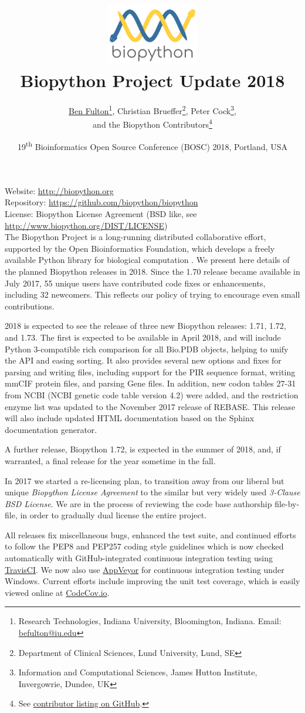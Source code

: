 \documentclass[10pt,oneside]{article}
\title{%
\vspace{-1.5in}
\includegraphics[width=0.3\textwidth]{biopython_logo_s.png} \\
\vspace{3mm}Biopython Project Update 2018}
\author{
	\underline{Ben Fulton}\thanks{Research Technologies, Indiana University, Bloomington, Indiana. Email: \href{mailto:befulton@iu.edu}{befulton@iu.edu}},
    Christian Brueffer\thanks{Department of Clinical Sciences, Lund University, Lund, SE},
    Peter Cock\thanks{Information and Computational Sciences, James Hutton Institute, Invergowrie, Dundee, UK},\\
    and the Biopython Contributors\thanks{See \href{https://github.com/biopython/biopython/blob/master/CONTRIB.rst}{contributor listing on GitHub}.}}
\date{19\textsuperscript{th} Bioinformatics Open Source Conference (BOSC) 2018, Portland, USA}
\begin{document}
\maketitle
\thispagestyle{empty}

\vspace{-0.2in}
\noindent
Website: \url{http://biopython.org} \\
Repository: \url{https://github.com/biopython/biopython} \\
License: Biopython License Agreement (BSD like, see \url{http://www.biopython.org/DIST/LICENSE}) \\

The Biopython Project is a long-running distributed collaborative effort,
supported by the Open Bioinformatics Foundation, which develops a freely
available Python library for biological computation \cite{AppNote}.
We present here details of the planned Biopython releases in 2018. 
Since the 1.70 release 
became available in July 2017, 55 unique users have contributed code 
fixes or enhancements, including 32 newcomers. This reflects our policy of
trying to encourage even small contributions.

2018 is expected to see the release of three new Biopython releases: 1.71, 1.72,
and 1.73. The first is expected to be available in April 2018, and will include
Python 3-compatible rich
comparison for all Bio.PDB objects, helping to unify the API and easing sorting.
It also provides several new options and fixes for parsing and writing files, 
including support for the PIR sequence format, writing mmCIF protein files, and parsing Gene files.
In addition, new codon tables 27-31 from NCBI (NCBI genetic code table version 4.2) were added,
and the restriction enzyme list was updated to the November 2017 release of REBASE.
This release will also include updated HTML
documentation based on the Sphinx documentation generator.

A further release, Biopython 1.72, is expected in the summer of 2018, and, if
warranted, a final release for the year sometime in the fall.

In 2017 we started a re-licensing plan, to transition away
from our liberal but unique \emph{Biopython License Agreement} to the similar
but very widely used \emph{3-Clause BSD License}. We are in the process of 
reviewing the code base authorship file-by-file, in order to gradually dual 
license the entire project.

All releases fix miscellaneous bugs, enhanced the test suite,
and continued efforts to follow the PEP8 and PEP257 coding style guidelines
which is now checked automatically with GitHub-integrated continuous integration
testing using \href{https://travis-ci.org/biopython/biopython/builds}{TravisCI}.
We now also use \href{https://ci.appveyor.com/project/biopython/biopython/history}{AppVeyor}
for continuous integration testing under Windows.
Current efforts include improving the unit test coverage, which is easily viewed
online at \href{https://codecov.io/github/biopython/biopython/}{CodeCov.io}.
\end{document}
